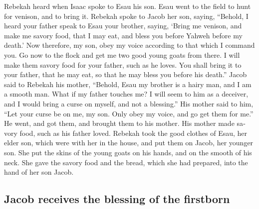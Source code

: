 \begin{paracol}{2}
\begin{otherlanguage}{english}
 Rebekah heard when Isaac spoke to Esau his son. Esau went
to the field to hunt for venison, and to bring it. 
Rebekah spoke to Jacob her son, saying, ``Behold, I heard your father
speak to Esau your brother, saying,  `Bring me venison,
and make me savory food, that I may eat, and bless you before Yahweh
before my death.'  Now therefore, my son, obey my voice
according to that which I command you.  Go now to the
flock and get me two good young goats from there. I will make them
savory food for your father, such as he loves.  You shall
bring it to your father, that he may eat, so that he may bless you
before his death.''  Jacob said to Rebekah his mother,
``Behold, Esau my brother is a hairy man, and I am a smooth man.
 What if my father touches me? I will seem to him as a
deceiver, and I would bring a curse on myself, and not a blessing.''
 His mother said to him, ``Let your curse be on me, my
son. Only obey my voice, and go get them for me.''  He
went, and got them, and brought them to his mother. His mother made
savory food, such as his father loved.  Rebekah took the
good clothes of Esau, her elder son, which were with her in the house,
and put them on Jacob, her younger son.  She put the
skins of the young goats on his hands, and on the smooth of his neck.
 She gave the savory food and the bread, which she had
prepared, into the hand of her son Jacob.

\hypertarget{jacob-receives-the-blessing-of-the-firstborn}{%
\subsection{Jacob receives the blessing of the
firstborn}\label{jacob-receives-the-blessing-of-the-firstborn}}


\end{otherlanguage}
\end{paracol}
